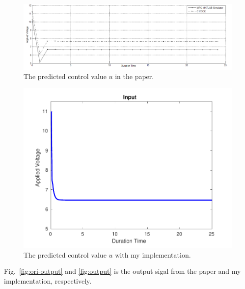 \documentclass{article}
\begin{document}
\begin{minipage}{\textwidth}
    \begin{minipage}{0.6\textwidth}
        \begin{figure}[H]
            \centering
            \includegraphics[width=\textwidth]{src/ori_input.png}
            \caption{The predicted control value $u$ in the paper.}
            \label{fig:ori-input}
        \end{figure}
    \end{minipage}
    \begin{minipage}{0.4\textwidth}
        \begin{figure}[H]
            \centering
            \includegraphics[width=\textwidth]{src/input.pdf}
            \caption{The predicted control value $u$ with my implementation.}
            \label{fig:input}
        \end{figure}
    \end{minipage}

\end{minipage}

Fig.~\ref{fig:ori-output} and \ref{fig:output} is the output sigal from the paper and my implementation, respectively.
\end{document}
